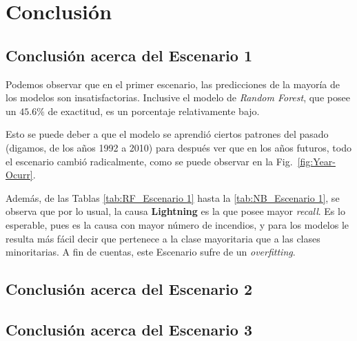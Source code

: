 \section{Conclusión}

\subsection{Conclusión acerca del Escenario 1}
Podemos observar que en el primer escenario, las predicciones de la mayoría de los modelos son insatisfactorias. Inclusive el modelo de \textit{Random Forest}, que posee un $45.6\%$ de exactitud, es un porcentaje relativamente bajo. 

Esto se puede deber a que el modelo se aprendió ciertos patrones del pasado (digamos, de los años 1992 a 2010) para después ver que en los años futuros, todo el escenario cambió radicalmente, como se puede observar en la Fig.~\ref{fig:Year-Ocurr}.

Además, de las Tablas \ref{tab:RF_Escenario 1} hasta la \ref{tab:NB_Escenario 1}, se observa que por lo usual, la causa \textbf{Lightning} es la que posee mayor \textit{recall}. Es lo esperable, pues es la causa con mayor número de incendios, y para los modelos le resulta más fácil decir que pertenece a la clase mayoritaria que a las clases minoritarias. A fin de cuentas, este Escenario sufre de un \textit{overfitting}.

\subsection{Conclusión acerca del Escenario 2}


\subsection{Conclusión acerca del Escenario 3}